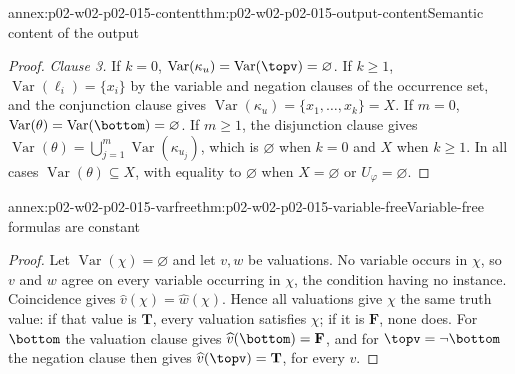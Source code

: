\begin{annexitem}{annex:p02-w02-p02-015-content}{thm:p02-w02-p02-015-output-content}{Semantic content of the output}
\begin{proof}
\emph{Clause 3.}  If \(k=0\), \(\operatorname{Var}(\kappa_u)=
\operatorname{Var}(\topv)=\varnothing\).  If \(k\geq 1\),
\(\operatorname{Var}(\ell_i)=\{x_i\}\) by the variable and negation clauses
of the occurrence set, and the conjunction clause gives
\(\operatorname{Var}(\kappa_u)=\{x_1,\ldots,x_k\}=X\).  If \(m=0\),
\(\operatorname{Var}(\theta)=\operatorname{Var}(\bottom)=\varnothing\).  If
\(m\geq 1\), the disjunction clause gives
\(\operatorname{Var}(\theta)=\bigcup_{j=1}^{m}\operatorname{Var}(\kappa_{u_j})\),
which is \(\varnothing\) when \(k=0\) and \(X\) when \(k\geq 1\).  In all cases
\(\operatorname{Var}(\theta)\subseteq X\), with equality to \(\varnothing\)
when \(X=\varnothing\) or \(U_\varphi=\varnothing\).
\end{proof}
\end{annexitem}

\begin{annexitem}{annex:p02-w02-p02-015-varfree}{thm:p02-w02-p02-015-variable-free}{Variable-free formulas are constant}
\begin{proof}
Let \(\operatorname{Var}(\chi)=\varnothing\) and let \(v,w\) be valuations.
No variable occurs in \(\chi\), so \(v\) and \(w\) agree on every variable
occurring in \(\chi\), the condition having no instance.  Coincidence gives
\(\widehat v(\chi)=\widehat w(\chi)\).  Hence all valuations give \(\chi\) the
same truth value: if that value is \(\mathbf{T}\), every valuation satisfies
\(\chi\); if it is \(\mathbf{F}\), none does.  For \(\bottom\) the valuation clause
gives \(\widehat v(\bottom)=\mathbf{F}\), and for \(\topv=\neg\bottom\) the
negation clause then gives \(\widehat v(\topv)=\mathbf{T}\), for every \(v\).
\end{proof}
\end{annexitem}

